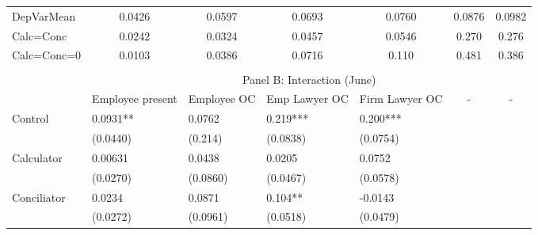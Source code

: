 \begin{tabular}{rrrrrrr}
\multicolumn{1}{l}{DepVarMean} & \multicolumn{1}{c}{0.0426} & \multicolumn{1}{c}{0.0597} & \multicolumn{1}{c}{0.0693} & \multicolumn{1}{c}{0.0760} & \multicolumn{1}{c}{0.0876} & \multicolumn{1}{c}{0.0982} \\
\multicolumn{1}{l}{Calc=Conc} & \multicolumn{1}{c}{0.0242} & \multicolumn{1}{c}{0.0324} & \multicolumn{1}{c}{0.0457} & \multicolumn{1}{c}{0.0546} & \multicolumn{1}{c}{0.270} & \multicolumn{1}{c}{0.276} \\
\multicolumn{1}{l}{Calc=Conc=0} & \multicolumn{1}{c}{0.0103} & \multicolumn{1}{c}{0.0386} & \multicolumn{1}{c}{0.0716} & \multicolumn{1}{c}{0.110} & \multicolumn{1}{c}{0.481} & \multicolumn{1}{c}{0.386} \\
\bottomrule
\multicolumn{1}{l}{} &       &       &       &       &       &  \\
\toprule
\multicolumn{1}{l}{} & \multicolumn{6}{c}{Panel B: Interaction (June)} \\
\midrule
\multicolumn{1}{l}{} & \multicolumn{1}{c}{Employee present} & \multicolumn{1}{c}{Employee OC} & \multicolumn{1}{c}{Emp Lawyer OC} & \multicolumn{1}{c}{Firm Lawyer OC} & \multicolumn{1}{c}{-} & \multicolumn{1}{c}{-} \\
\midrule
\midrule
\multicolumn{1}{l}{Control} & \multicolumn{1}{l}{0.0931**} & \multicolumn{1}{l}{0.0762} & \multicolumn{1}{l}{0.219***} & \multicolumn{1}{l}{0.200***} & \multicolumn{1}{l}{} & \multicolumn{1}{l}{} \\
\multicolumn{1}{l}{} & \multicolumn{1}{l}{(0.0440)} & \multicolumn{1}{l}{(0.214)} & \multicolumn{1}{l}{(0.0838)} & \multicolumn{1}{l}{(0.0754)} & \multicolumn{1}{l}{} & \multicolumn{1}{l}{} \\
\multicolumn{1}{l}{Calculator} & \multicolumn{1}{l}{0.00631} & \multicolumn{1}{l}{0.0438} & \multicolumn{1}{l}{0.0205} & \multicolumn{1}{l}{0.0752} & \multicolumn{1}{l}{} & \multicolumn{1}{l}{} \\
\multicolumn{1}{l}{} & \multicolumn{1}{l}{(0.0270)} & \multicolumn{1}{l}{(0.0860)} & \multicolumn{1}{l}{(0.0467)} & \multicolumn{1}{l}{(0.0578)} & \multicolumn{1}{l}{} & \multicolumn{1}{l}{} \\
\multicolumn{1}{l}{Conciliator} & \multicolumn{1}{l}{0.0234} & \multicolumn{1}{l}{0.0871} & \multicolumn{1}{l}{0.104**} & \multicolumn{1}{l}{-0.0143} & \multicolumn{1}{l}{} & \multicolumn{1}{l}{} \\
\multicolumn{1}{l}{} & \multicolumn{1}{l}{(0.0272)} & \multicolumn{1}{l}{(0.0961)} & \multicolumn{1}{l}{(0.0518)} & \multicolumn{1}{l}{(0.0479)} & \multicolumn{1}{l}{} & \multicolumn{1}{l}{} \\

\end{tabular}
